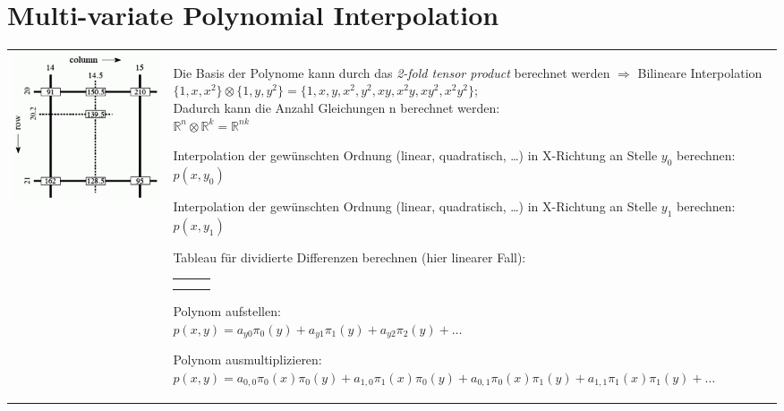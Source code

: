 \section{Multi-variate Polynomial Interpolation}
\begin{tabular}{ll}
  \parbox{6cm}{
    \includegraphics[width=6cm]{./bilder/bilineare_interpolation}
  }
  & \parbox{12.5cm} {
    \begin{aufzaehlung}
      \item 
        Die Basis der Polynome kann durch das \emph{2-fold tensor product} berechnet werden $\Rightarrow$ Bilineare Interpolation \\
        $\{1,x,x^2\} \otimes \{1, y, y^2\} = \{1,x,y,x^2,y^2,xy, x^2y, xy^2, x^2y^2\}$; \\
        Dadurch kann die Anzahl Gleichungen n berechnet werden: \\$\mathbb R^n \otimes \mathbb R^k = \mathbb R^{nk}$
      \item Interpolation der gewünschten Ordnung (linear, quadratisch, \ldots) in X-Richtung an 
        Stelle $y_0$ berechnen: $p(x,y_0)$
      \item Interpolation der gewünschten Ordnung (linear, quadratisch, \ldots) in X-Richtung an 
        Stelle $y_1$ berechnen: $p(x,y_1)$
      \item Tableau für dividierte Differenzen berechnen (hier linearer Fall):\\
        \begin{tabular}{l|ll}
          $y$ & $z$\\
          \hline
          $y_0$ & $p(x,y_0) = a_{y0}$\\
          $y_1$ & $p(x,y_1)$ & $\frac{p(x,y_1) - p(x,y_0)}{y_1-y_0} = a_{y1}$
        \end{tabular}
      \item Polynom aufstellen:\\
        $p(x,y) = a_{y0} \pi_0(y) + a_{y1} \pi_1(y) + a_{y2} \pi_2(y)+\ldots$
      \item Polynom ausmultiplizieren:\\
          $p(x,y) = a_{0,0} \pi_0(x)\pi_0(y) + a_{1,0} \pi_1(x)\pi_0(y) + a_{0,1} \pi_0(x)\pi_1(y) + a_{1,1} \pi_1(x)\pi_1(y)+\ldots$ 
    \end{aufzaehlung}
  }

\end{tabular}
